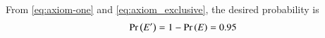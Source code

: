 From
	\eqref{eq:axiom-one}
	and
\eqref{eq:axiom_exclusive},
the desired probability is
\begin{align}
\Pr\left(E ^\prime\right) = 1 - \Pr\left(E\right)
= 0.95
\end{align}



